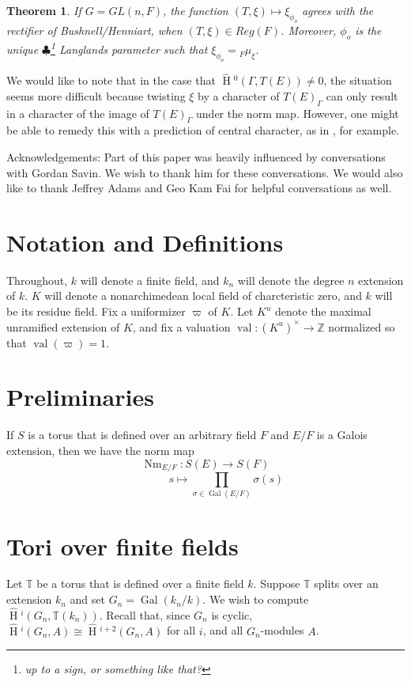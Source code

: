 \documentclass[11pt]{amsart}
\theoremstyle{plain}
\newtheorem{theorem}{Theorem}[section]
\newcommand{\MAxxx}[1]{$\clubsuit$\footnote{#1}}
\newcommand{\HT}[1]{\hat{\HH}{}^{#1}}
\theoremstyle{definition}
\DeclareMathOperator{\Gal}{Gal}
\DeclareMathOperator{\val}{val}
\DeclareMathOperator{\HH}{H}
\DeclareMathOperator{\Nm}{Nm}
\begin{document}
\begin{theorem}
  If $G = GL(n,F)$, the function $(T,\xi) \mapsto \xi_{\phi_o}$ agrees with
  the rectifier of Bushnell/Henniart, when $(T,\xi) \in Reg(F)$.  Moreover, $\phi_o$ is the
  unique \MAxxx{up to a sign, or something like that?} Langlands
  parameter such that $\xi_{\phi_o} = {}_F \mu_{\xi}$.
\end{theorem}

We would like to note that in the case that $\HT{0}(\Gamma, T(E))
\neq 0$, the situation seems more difficult because twisting $\xi$ 
by a character of $T(E)_{\Gamma}$
can only result in a character of the image 
of $T(E)_{\Gamma}$ under the norm map.  However, one might be
able to remedy this with a prediction of central character, as in
\cite{grossreeder}, for example.

Acknowledgements: Part of this paper was heavily influenced by
conversations with Gordan Savin.  We wish to thank him for these
conversations.  We would also like to thank Jeffrey Adams and Geo Kam
Fai for helpful conversations as well.

\section{Notation and Definitions}

Throughout, $k$ will denote a finite field, and
$k_n$ will denote the degree $n$ extension of
$k$.  $K$ will denote a nonarchimedean local field of
charcteristic zero, and $k$ will be its residue field.  Fix
a uniformizer $\varpi$ of $K$.  Let $K^u$ denote the maximal
unramified extension of $K$, and fix a valuation $\val : (K^u)^\times
\rightarrow \mathbb{Z}$ normalized so that $\val(\varpi) = 1$.

\section{Preliminaries}

If $S$ is a torus that is defined over an arbitrary field $F$ and
$E/F$ is a Galois extension, then we have the norm map
$$\Nm_{E/F} : S(E) \rightarrow S(F)$$ $$\ \ \ \ \ \ \ \ \ \ \ \ \ \ \ \ \ s \mapsto
\prod_{\sigma \in \Gal(E/F)} \sigma(s)$$

\section{Tori over finite fields}

Let $\mathbb{T}$ be a torus that is defined over a finite field
$k$.  Suppose $\mathbb{T}$ splits over an extension
$k_n$ and set $G_n = \Gal(k_n/k)$.
We wish to compute $\HT{i}(G_n,\mathbb{T}(k_n))$.
Recall that, since $G_n$ is cyclic, $\HT{i}(G_n,A)\cong
\HT{i+2}(G_n,A)$ for all $i$, and all $G_n$-modules $A$.
\end{document}
